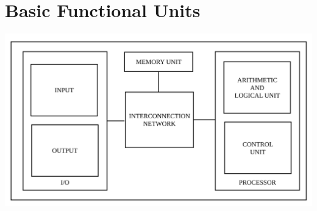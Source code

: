 \documentclass[british]{extreport}
\begin{document}
\section{Basic Functional Units}
\begin{center}
	\includegraphics[scale=0.3]{Picture/FUNCTIONAL_UNIT}
	\par\end{center}
\end{document}
